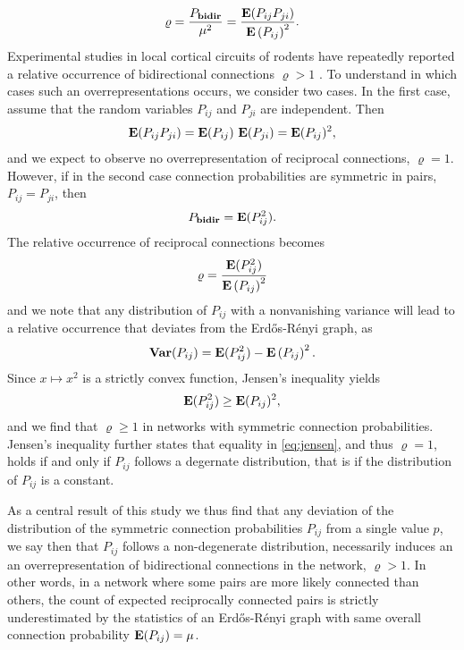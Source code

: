 \begin{align}
\varrho = \frac{P_{\mathbf{bidir}}}{\mu^2} = \frac{\operatorname{\mathbf{E}}(P_{ij}P_{ji})}{{\operatorname{\mathbf{E}}\left(P_{ij}\right)}^2}.
\end{align}
%
Experimental studies in local cortical circuits of rodents have repeatedly reported a relative occurrence of bidirectional connections $\varrho > 1$ \cite{Markram1997, Song2005, Perin2011}. To understand in which cases such an overrepresentations occurs, we consider two cases. In the first case, assume that the random variables $P_{ij}$ and $P_{ji}$ are independent. Then
\begin{align}
\operatorname{\mathbf{E}}(P_{ij} P_{ji}) = \operatorname{\mathbf{E}}(P_{ij})\,\operatorname{\mathbf{E}}(P_{ji}) = \operatorname{\mathbf{E}}(P_{ij})^2,
\end{align}
and we expect to observe no overrepresentation of reciprocal connections, $\varrho = 1$. However, if in the second case connection probabilities are symmetric in pairs, $P_{ij} = P_{ji}$, then 
\begin{align}
P_{\mathbf{bidir}} = \operatorname{\mathbf{E}}(P_{ij}^2).
\end{align}
%
The relative occurrence of reciprocal connections becomes
\begin{align}
\varrho = \frac{\operatorname{\mathbf{E}}(P_{ij}^2)}{{\operatorname{\mathbf{E}}\left(P_{ij}\right)}^2}
\end{align}
and we note that any distribution of $P_{ij}$ with a nonvanishing variance will lead to a relative occurrence that deviates from the Erd\H{o}s-R\'{e}nyi graph, as
\begin{align}
\operatorname{\mathbf{Var}}(P_{ij}) = \operatorname{\mathbf{E}}(P_{ij}^2) - \operatorname{\mathbf{E}}\left(P_{ij}\right)^2.
\end{align}
Since $x \mapsto x^2$ is a strictly convex function, Jensen's inequality \cite{Jensen1906, Cover2006} yields
\begin{align}
\operatorname{\mathbf{E}}(P_{ij}^2) \geq \operatorname{\mathbf{E}}(P_{ij})^2, \label{eq:jensen}
\end{align}
and we find that $\varrho \geq 1$ in networks with symmetric connection probabilities. Jensen's inequality further states that equality in \eqref{eq:jensen}, and thus $\varrho = 1$, holds if and only if $P_{ij}$ follows a degernate distribution, that is if the distribution of $P_{ij}$ is a constant.

As a central result of this study we thus find that any deviation of the distribution of the symmetric connection probabilities $P_{ij}$ from a single value $p$, we say then that $P_{ij}$ follows a non-degenerate distribution, necessarily induces an an overrepresentation of bidirectional connections in the network, $\varrho > 1$. In other words, in a network where some pairs are more likely connected than others, the count of expected reciprocally connected pairs is strictly underestimated by the statistics of an Erd\H{o}s-R\'{e}nyi graph with same overall connection probability $\operatorname{\mathbf{E}}(P_{ij}) = \mu$.

